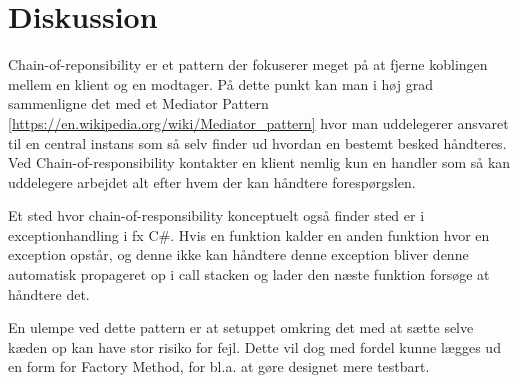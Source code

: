 \chapter{Diskussion}
Chain-of-reponsibility er et pattern der fokuserer meget på at fjerne koblingen mellem en klient og en modtager. På dette punkt kan man i høj grad sammenligne det med et Mediator Pattern \ref{https://en.wikipedia.org/wiki/Mediator_pattern} hvor man uddelegerer ansvaret til en central instans som så selv finder ud hvordan en bestemt besked håndteres.
Ved Chain-of-responsibility kontakter en klient nemlig kun en handler som så kan uddelegere arbejdet alt efter hvem der kan håndtere forespørgslen.

Et sted hvor chain-of-responsibility konceptuelt også finder sted er i exceptionhandling i fx C#. Hvis en funktion kalder en anden funktion hvor en exception opstår, og denne ikke kan håndtere denne exception bliver denne automatisk propageret op i call stacken og lader den næste funktion forsøge at håndtere det. 

En ulempe ved dette pattern er at setuppet omkring det med at sætte selve kæden op kan have stor risiko for fejl. Dette vil dog med fordel kunne lægges ud en form for Factory Method, for bl.a. at gøre designet mere testbart.
